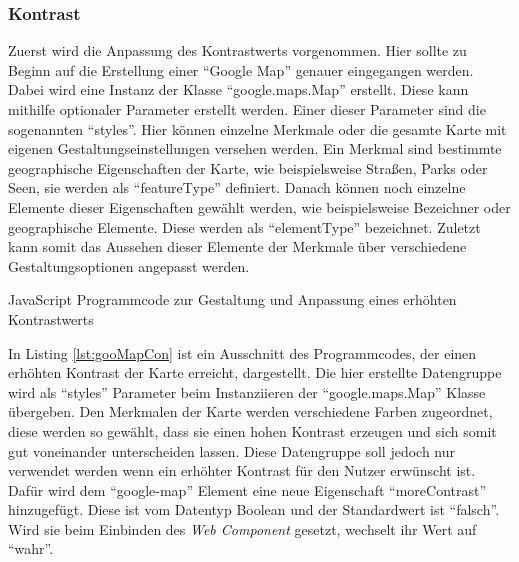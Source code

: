 \documentclass[12pt, paper=a4, bibtotoc, toc=listof, headsepline=true]{scrreprt}
\begin{document}
	\subsubsection{Kontrast}
	Zuerst wird die Anpassung des Kontrastwerts vorgenommen. Hier sollte zu Beginn auf die Erstellung einer \enquote{Google Map} genauer eingegangen werden. Dabei wird eine Instanz der Klasse \enquote{google.maps.Map} erstellt. Diese kann mithilfe optionaler Parameter erstellt werden. Einer dieser Parameter sind die sogenannten \enquote{styles}. Hier können einzelne Merkmale oder die gesamte Karte mit eigenen Gestaltungseinstellungen versehen werden. Ein Merkmal sind bestimmte geographische Eigenschaften der Karte, wie beispielsweise Straßen, Parks oder Seen, sie werden als \enquote{featureType} definiert. Danach können noch einzelne Elemente dieser Eigenschaften gewählt werden, wie beispielsweise Bezeichner oder geographische Elemente. Diese werden als \enquote{elementType} bezeichnet. Zuletzt kann somit das Aussehen dieser Elemente der Merkmale über verschiedene Gestaltungsoptionen angepasst werden\cite{gmapStyle}.
	\begin{listing}[H]
		\caption[Anpassung zur Erhöhung des Kontrastwerts]{JavaScript Programmcode zur Gestaltung und Anpassung eines erhöhten Kontrastwerts}
		\label{lst:gooMapCon}
	\end{listing}
	In Listing \ref{lst:gooMapCon} ist ein Ausschnitt des Programmcodes, der einen erhöhten Kontrast der Karte erreicht, dargestellt. Die hier erstellte Datengruppe wird als \enquote{styles} Parameter beim Instanziieren der \enquote{google.maps.Map} Klasse übergeben. Den Merkmalen der Karte werden verschiedene Farben zugeordnet, diese werden so gewählt, dass sie einen hohen Kontrast erzeugen und sich somit gut voneinander unterscheiden lassen. Diese Datengruppe soll jedoch nur verwendet werden wenn ein erhöhter Kontrast für den Nutzer erwünscht ist. Dafür wird dem \enquote{google-map} Element eine neue Eigenschaft \enquote{moreContrast} hinzugefügt. Diese ist vom Datentyp Boolean und der Standardwert ist \enquote{falsch}. Wird sie beim Einbinden des \emph{Web Component} gesetzt, wechselt ihr Wert auf \enquote{wahr}. 
\end{document}
